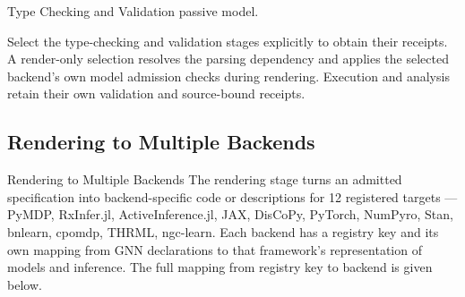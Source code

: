\documentclass[
  ignorenonframetext,
]{beamer}
\begin{document}
\begin{frame}{Type Checking and Validation}
passive model.

Select the type-checking and validation stages explicitly to obtain
their receipts. A render-only selection resolves the parsing dependency
and applies the selected backend's own model admission checks during
rendering. Execution and analysis retain their own validation and
source-bound receipts.
\end{frame}

\subsection{Rendering to Multiple
Backends}\label{rendering-to-multiple-backends}

\begin{frame}{Rendering to Multiple Backends}
The rendering stage turns an admitted specification into
backend-specific code or descriptions for 12 registered targets ---
PyMDP, RxInfer.jl, ActiveInference.jl, JAX, DisCoPy, PyTorch, NumPyro,
Stan, bnlearn, cpomdp, THRML, ngc-learn. Each backend has a registry key
and its own mapping from GNN declarations to that framework's
representation of models and inference. The full mapping from registry
key to backend is given below.

\end{frame}
\end{document}
